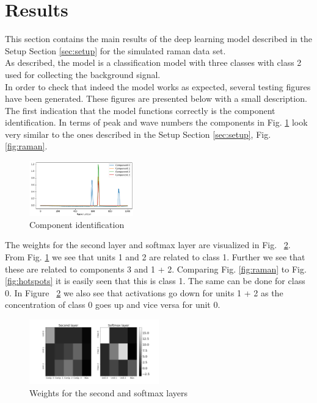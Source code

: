 \documentclass{article}
\begin{document}
\section{Results}
\label{sec:results}
This section contains the main results of the deep learning model described in the Setup Section \ref{sec:setup} for the simulated raman data set.\\
As described, the model is a classification model with three classes with class 2 used for collecting the background signal. \\%
In order to check that indeed the model works as expected, several testing figures have been generated. These figures are presented below with a small description.\\
The first indication that the model functions correctly is the component identification. In terms of peak and wave numbers the components in Fig. \ref{fig:components} look very similar to the ones described in the Setup Section \ref{sec:setup}, Fig. \ref{fig:raman}. 
\begin{figure}[H]
	\centering
	\includegraphics[width=0.4\textwidth]{raman_sim_3_encode_layer_1_finetune_13.png}
	\caption{Component identification}
	\label{fig:components}
\end{figure}
%
The weights for the second layer and softmax layer are visualized in Fig. ~\ref{fig:weights}. From Fig. \ref{fig:components} we see that units 1 and 2 are related to class 1. Further we see that these are related to components 3 and 1 + 2. Comparing Fig. \ref{fig:raman} to Fig. \ref{fig:hotspots} it is easily seen that this is class 1. The same can be done for class 0. In Figure ~\ref{fig:weights} we also see that activations go down for units 1 + 2 as the concentration of class 0 goes up and vice versa for unit 0.\\ 
%
\begin{figure}[H]
  \includegraphics[width=0.5\textwidth]{raman_sim_second_softmax_encode_2.png}
  \caption{Weights for the second and softmax layers}
  \label{fig:weights}
\end{figure}
\end{document}
